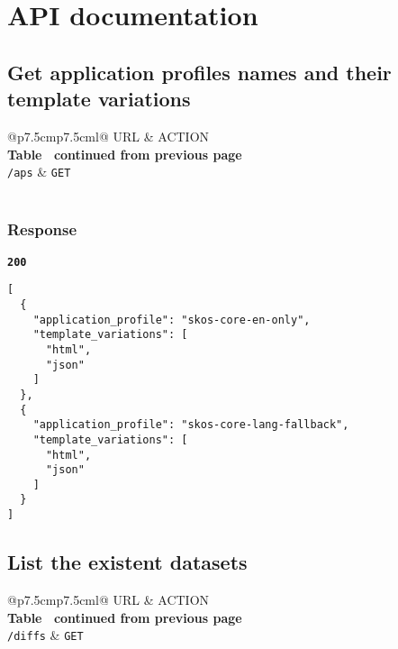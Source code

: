 \section{API documentation}

\subsection{Get application profiles names and their template variations}

\begin{longtable}[c]{@{}p{7.5cm}p{7.5cm}l@{}}
  \toprule
  URL           & ACTION                                      \\* \midrule
  \endfirsthead
  \multicolumn{3}{c}%
  {{\bfseries Table \thetable\ continued from previous page}} \\
  \endhead
  \bottomrule
  \endfoot
  \endlastfoot
  \texttt{/aps} & \texttt{GET}                                \\* \bottomrule
  \label{tab:rdf-differ-get-aps}                              \\
\end{longtable}

\subsubsection{Response}
\textbf{\texttt{200}}
\begin{lstlisting}
[
  {
    "application_profile": "skos-core-en-only",
    "template_variations": [
      "html",
      "json"
    ]
  },
  {
    "application_profile": "skos-core-lang-fallback",
    "template_variations": [
      "html",
      "json"
    ]
  }
]
\end{lstlisting}

\subsection{List the existent datasets}

\begin{longtable}[c]{@{}p{7.5cm}p{7.5cm}l@{}}
  \toprule
  URL             & ACTION                                    \\* \midrule
  \endfirsthead
  \multicolumn{3}{c}%
  {{\bfseries Table \thetable\ continued from previous page}} \\
  \endhead
  \bottomrule
  \endfoot
  \endlastfoot
  \texttt{/diffs} & \texttt{GET}                              \\* \bottomrule
  \label{tab:rdf-differ-get-diffs}                            \\
\end{longtable}


